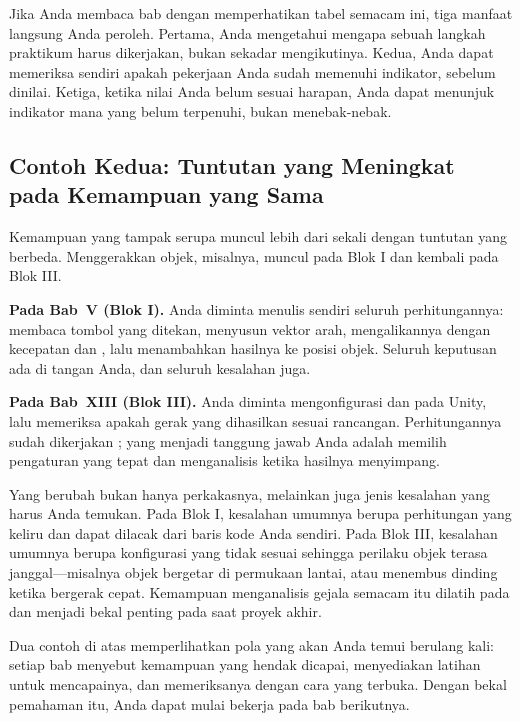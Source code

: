 Jika Anda membaca bab dengan memperhatikan tabel semacam ini, tiga manfaat
langsung Anda peroleh. Pertama, Anda mengetahui mengapa sebuah langkah
praktikum harus dikerjakan, bukan sekadar mengikutinya. Kedua, Anda dapat
memeriksa sendiri apakah pekerjaan Anda sudah memenuhi indikator, sebelum
dinilai. Ketiga, ketika nilai Anda belum sesuai harapan, Anda dapat menunjuk
indikator mana yang belum terpenuhi, bukan menebak-nebak.

\subsection{Contoh Kedua: Tuntutan yang Meningkat pada Kemampuan yang Sama}

Kemampuan yang tampak serupa muncul lebih dari sekali dengan
tuntutan yang berbeda. Menggerakkan objek, misalnya, muncul pada Blok I dan
kembali pada Blok III.

\begin{contohbox}
\textbf{Pada Bab~V (Blok I).} Anda diminta menulis sendiri seluruh
perhitungannya: membaca tombol yang ditekan, menyusun vektor arah,
mengalikannya dengan kecepatan dan , lalu menambahkan
hasilnya ke posisi objek. Seluruh keputusan ada di tangan Anda, dan seluruh
kesalahan juga.

\vspace{0.4em}
\textbf{Pada Bab~XIII (Blok III).} Anda diminta mengonfigurasi
 dan  pada Unity, lalu memeriksa apakah
gerak yang dihasilkan sesuai rancangan. Perhitungannya sudah dikerjakan
; yang menjadi tanggung jawab Anda adalah memilih
pengaturan yang tepat dan menganalisis ketika hasilnya menyimpang.
\end{contohbox}

Yang berubah bukan hanya perkakasnya, melainkan juga jenis kesalahan yang
harus Anda temukan. Pada Blok I, kesalahan umumnya berupa perhitungan yang
keliru dan dapat dilacak dari baris kode Anda sendiri. Pada Blok III,
kesalahan umumnya berupa konfigurasi yang tidak sesuai sehingga perilaku objek
terasa janggal---misalnya objek bergetar di permukaan lantai, atau menembus
dinding ketika bergerak cepat. Kemampuan menganalisis gejala semacam itu
dilatih pada  dan menjadi bekal penting pada saat proyek akhir.

Dua contoh di atas memperlihatkan pola yang akan Anda temui berulang kali:
setiap bab menyebut kemampuan yang hendak dicapai, menyediakan latihan untuk
mencapainya, dan memeriksanya dengan cara yang terbuka. Dengan bekal
pemahaman itu, Anda dapat mulai bekerja pada bab berikutnya.
